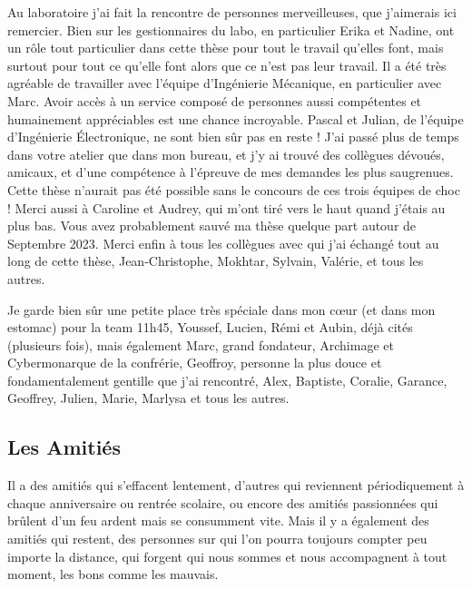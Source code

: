 \vskip 1cm

Au laboratoire j'ai fait la rencontre de personnes merveilleuses, que j'aimerais ici remercier. Bien sur les gestionnaires du labo, en particulier Erika et Nadine, ont un rôle tout particulier dans cette thèse pour tout le travail qu'elles font, mais surtout pour tout ce qu'elle font alors que ce n'est pas leur travail. Il a été très agréable de travailler avec l'équipe d'Ingénierie Mécanique, en particulier avec Marc. Avoir accès à un service composé de personnes aussi compétentes et humainement appréciables est une chance incroyable. Pascal et Julian, de l'équipe d'Ingénierie Électronique, ne sont bien sûr pas en reste ! J'ai passé plus de temps dans votre atelier que dans mon bureau, et j'y ai trouvé des collègues dévoués, amicaux, et d'une compétence à l'épreuve de mes demandes les plus saugrenues. Cette thèse n'aurait pas été possible sans le concours de ces trois équipes de choc ! Merci aussi à Caroline et Audrey, qui m'ont tiré vers le haut quand j'étais au plus bas. Vous avez probablement sauvé ma thèse quelque part autour de Septembre 2023. Merci enfin à tous les collègues avec qui j'ai échangé tout au long de cette thèse, Jean-Christophe, Mokhtar, Sylvain, Valérie, et tous les autres.

Je garde bien sûr une petite place très spéciale dans mon cœur (et dans mon estomac) pour la team 11h45, Youssef, Lucien, Rémi et Aubin, déjà cités (plusieurs fois), mais également Marc, grand fondateur, Archimage et Cybermonarque de la confrérie, Geoffroy, personne la plus douce et fondamentalement gentille que j'ai rencontré, Alex, Baptiste, Coralie, Garance, Geoffrey, Julien, Marie, Marlysa et tous les autres.



\vskip 1cm

\subsection*{Les Amitiés}

Il a des amitiés qui s'effacent lentement, d'autres qui reviennent périodiquement à chaque anniversaire ou rentrée scolaire, ou encore des amitiés passionnées qui brûlent d'un feu ardent mais se consumment vite. Mais il y a également des amitiés qui restent, des personnes sur qui l'on pourra toujours compter peu importe la distance, qui forgent qui nous sommes et nous accompagnent à tout moment, les bons comme les mauvais.

